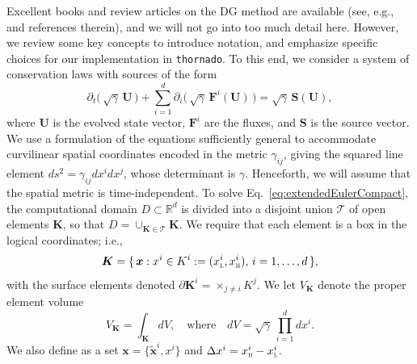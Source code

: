 \documentclass[letterpaper]{jpconf}
\newcommand{\vect}[1]{\boldsymbol{#1}}
\newcommand{\dx}{\Delta x}
\newcommand{\pd}[2]{\partial_{#2}{#1}}
\newcommand{\bx}{\vect{x}}
\newcommand{\bK}{\vect{K}}
\newcommand{\cT}{\mathcal{T}}
\newcommand{\xL}{x_{\textnormal{\tiny\textsc{L}}}}
\newcommand{\xH}{x_{\textnormal{\tiny\textsc{H}}}}
\newcommand{\thornado}{\texttt{thornado}}
\begin{document}
Excellent books and review articles on the DG method are available (see, e.g., \cite{cockburnShu_1998,cockburnShu_2001,hesthavenWarburton_2008,shu_2016} and references therein), and we will not go into too much detail here.  
However, we review some key concepts to introduce notation, and emphasize specific choices for our implementation in \thornado.  
To this end, we consider a system of conservation laws with sources of the form
\begin{equation}
  \pd{}{t}\big(\,\sqrt{\gamma}\,\vect{U}\,\big)
  +\sum_{i=1}^{d}\pd{}{i}\Big(\,\sqrt{\gamma}\,\vect{F}^{i}(\vect{U})\,\Big)
  =\sqrt{\gamma}\,\vect{S}(\vect{U}),
  \label{eq:extendedEulerCompact}
\end{equation}
where $\vect{U}$ is the evolved state vector, $\vect{F}^{i}$ are the fluxes, and $\vect{S}$ is the source vector.  
We use a formulation of the equations sufficiently general to accommodate curvilinear spatial coordinates encoded in the metric $\gamma_{ij}$, giving the squared line element $ds^{2}=\gamma_{ij}dx^{i}dx^{j}$, whose determinant is $\gamma$.  
Henceforth, we will assume that the spatial metric is time-independent.  
To solve Eq.~\eqref{eq:extendedEulerCompact}, the computational domain $D\subset\mathbb{R}^{d}$ is divided into a disjoint union $\cT$ of open elements $\bK$, so that $D = \cup_{\bK \in \cT}\bK$.  
We require that each element is a box in the logical coordinates; i.e.,
\begin{equation}
  \bK=\{\,\vect{x} : x^{i} \in K^{i} := (\xL^{i},\xH^{i}),\,i=1,\ldots,d\,\}, 
\end{equation}
with the surface elements denoted $\partial\bK^{i}=\times_{j\ne i}K^{j}$.  
We let $V_{\bK}$ denote the proper element volume
\begin{equation}
  V_{\bK} = \int_{\bK}dV, \quad\text{where}\quad dV = \sqrt{\gamma}\,\prod_{i=1}^{d}dx^{i}.  
\end{equation}
We also define as a set $\bx=\{\tilde{\bx}^{i},x^{i}\}$ and $\dx^{i}=\xH^{i}-\xL^{i}$.  
\end{document}
